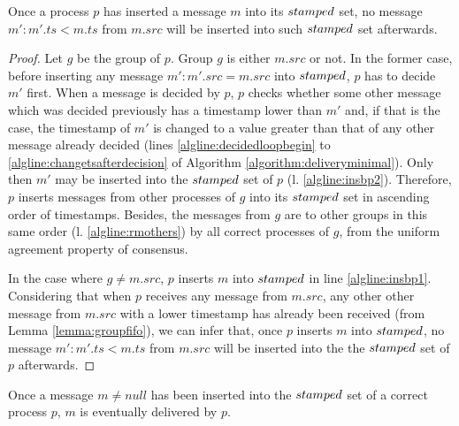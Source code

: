 \documentclass[times, 10pt]{article}
\begin{document}
\begin{lems} \label{lemma:oncedecidednotsmaller}
Once a process $p$ has inserted a message $m$ into its $stamped$ set, no message $m' : m'.ts < m.ts$ from $m.src$ will be inserted into such $stamped$ set afterwards.
\end{lems}

\begin{proof}
Let $g$ be the group of $p$. Group $g$ is either $m.src$ or not. In the former case, before inserting any message $m' : m'.src = m.src$ into $stamped$, $p$ has to decide $m'$ first. When a message is decided by $p$, $p$ checks whether some other message which was decided previously has a timestamp lower than $m'$ and, if that is the case, the timestamp of $m'$ is changed to a value greater than that of any other message already decided (lines \ref{algline:decidedloopbegin} to \ref{algline:changetsafterdecision} of Algorithm \ref{algorithm:deliveryminimal}). Only then $m'$ may be inserted into the $stamped$ set of $p$ (l. \ref{algline:insbp2}). Therefore, $p$ inserts messages from other processes of $g$ into its $stamped$ set in ascending order of timestamps. Besides, the messages from $g$ are \rmcast{} to other groups in this same order (l. \ref{algline:rmothers}) by all correct processes of $g$, from the uniform agreement property of consensus.

In the case where $g \neq m.src$, $p$ inserts $m$ into $stamped$ in line \ref{algline:insbp1}. Considering that when $p$ receives any message from $m.src$, any other other message from $m.src$ with a lower timestamp has already been received (from Lemma \ref{lemma:groupfifo}), we can infer that, once $p$ inserts $m$ into $stamped$, no message $m' : m'.ts < m.ts$ from $m.src$ will be inserted into the the $stamped$ set of $p$ afterwards.
\end{proof}





\begin{lems} \label{lemma:oncebpwilldel}
Once a message $m \neq null$ has been inserted into the $stamped$ set of a correct process $p$, $m$ is eventually delivered by $p$.
\end{lems}
\end{document}
